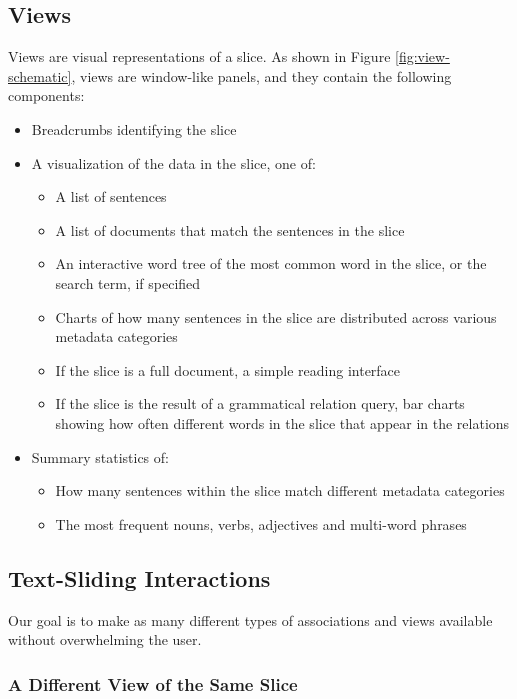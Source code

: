 \documentclass{sig-alternate}
\begin{document}
\subsection{Views}
Views are visual representations of a slice. As shown in Figure \ref{fig:view-schematic},  views  are window-like panels, and they contain the following components:
\begin{itemize}
	\item Breadcrumbs identifying the slice
	\item A visualization of the data in the slice, one of:
		\begin{itemize}
			\item A list of sentences
			\item A list of documents that match the sentences in the slice
			\item An interactive word tree \cite{wattenberg_word_2008} of the most common word in the slice, or the search term, if specified
			\item Charts of how many sentences in the slice are distributed across various metadata categories
			\item If the slice is a full document, a simple reading interface
			\item If the slice is the result of a grammatical relation query, bar charts showing how often different words in the slice that appear in the relations
		\end{itemize}
	\item Summary statistics of:
		\begin{itemize}
			\item How many sentences within the slice match different metadata categories
			\item The most frequent nouns, verbs, adjectives and multi-word phrases
		\end{itemize}
\end{itemize}

\subsection{Text-Sliding Interactions}

Our goal is to make as many different types of associations and views available without overwhelming the user.

\subsubsection{A Different View of the Same Slice}
\end{document}
